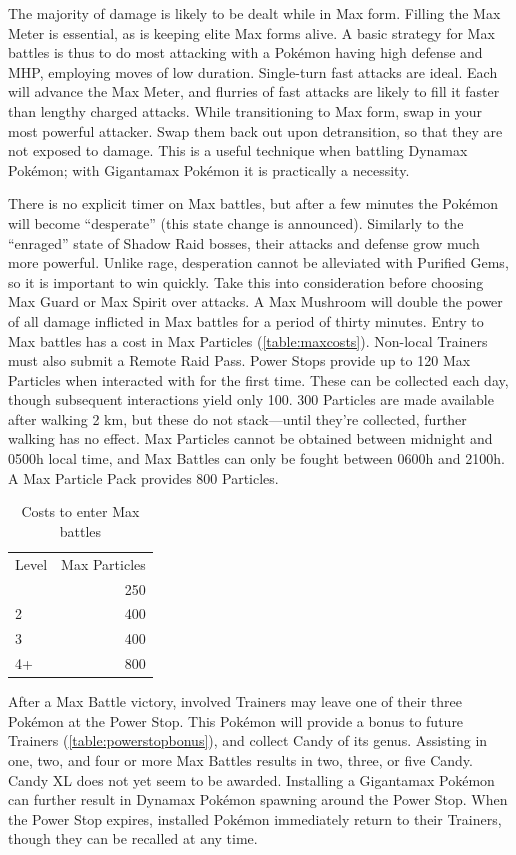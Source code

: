 The majority of damage is likely to be dealt while in Max form.
Filling the Max Meter is essential, as is keeping elite Max forms alive.
A basic strategy for Max battles is thus to do most attacking with a Pokémon having
  high defense and MHP, employing moves of low duration.
Single-turn fast attacks are ideal.
Each will advance the Max Meter, and flurries of fast attacks are likely to
 fill it faster than lengthy charged attacks.
While transitioning to Max form, swap in your most powerful attacker.
Swap them back out upon detransition, so that they are not exposed to damage.
This is a useful technique when battling Dynamax Pokémon; with Gigantamax Pokémon it is practically a necessity.

There is no explicit timer on Max battles, but after a few minutes the Pokémon
  will become ``desperate'' (this state change is announced).
Similarly to the ``enraged'' state of Shadow Raid bosses, their attacks and
  defense grow much more powerful.
Unlike rage, desperation cannot be alleviated with Purified Gems, so it
  is important to win quickly.
Take this into consideration before choosing Max Guard or Max Spirit over attacks.
A Max Mushroom will double the power of all damage inflicted in
  Max battles for a period of thirty minutes.
Entry to Max battles has a cost in Max Particles (\autoref{table:maxcosts}).
Non-local Trainers must also submit a Remote Raid Pass.
Power Stops provide up to 120 Max Particles when interacted with for the first time.
These can be collected each day, though subsequent interactions yield only 100.
300 Particles are made available after walking 2 km, but these do not stack---until
 they're collected, further walking has no effect.
Max Particles cannot be obtained between midnight and 0500h local time,
  and Max Battles can only be fought between 0600h and 2100h.
A Max Particle Pack provides 800 Particles.
\begin{table}
\centering
\begin{tabular}{lr}
Level & Max Particles\\
\Midrule
  1 & 250\\
  2 & 400\\
  3 & 400\\
  4+ & 800\\
\end{tabular}
\caption{Costs to enter Max battles\label{table:maxcosts}}
\end{table}

After a Max Battle victory, involved Trainers may leave one of their three Pokémon at the Power Stop.
This Pokémon will provide a bonus to future Trainers (\autoref{table:powerstopbonus}), and
  collect Candy of its genus.
Assisting in one, two, and four or more Max Battles results in two, three, or five Candy.
Candy XL does not yet seem to be awarded.
Installing a Gigantamax Pokémon can further result in Dynamax Pokémon spawning around the Power Stop.
When the Power Stop expires, installed Pokémon immediately return to their Trainers,
  though they can be recalled at any time.

